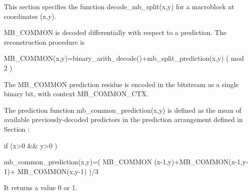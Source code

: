 This section specifies the function decode\_mb\_split(x,y) for a
macroblock at coordinates (x,y).

MB\_COMMON is decoded differentially with respect to a prediction. The
reconstruction procedure is 

MB\_COMMON(x,y)=binary\_arith\_decode()+mb\_split\_prediction(x,y) ( mod 2 )

The MB\_COMMON prediction residue is encoded in the bitstream as a single
binary bit, with context MB\_COMMON\_CTX.

The prediction function mb\_common\_prediction(x,y) is defined as the mean
of available previously-decoded predictors in the prediction arrangement
defined in Section :

if (x>0 \&\& y>0 )

    mb\_common\_prediction(x,y)=( MB\_COMMON (x-1,y)+MB\_COMMON(x-1,y-1)+
                                                        MB\_COMMON(x,y-1)
)/3

It returns a value 0 or 1.


